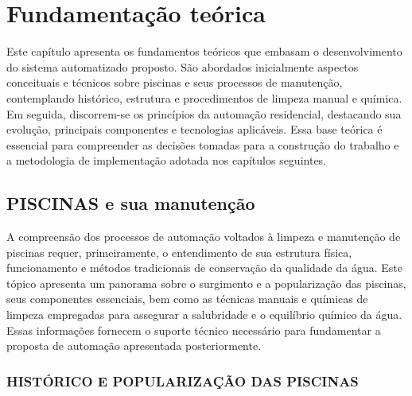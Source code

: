 \chapter{Fundamentação teórica}

    Este capítulo apresenta os fundamentos teóricos que embasam o desenvolvimento do sistema automatizado proposto. São abordados inicialmente aspectos conceituais e técnicos sobre piscinas e seus processos de manutenção, contemplando histórico, estrutura e procedimentos de limpeza manual e química. Em seguida, discorrem-se os princípios da automação residencial, destacando sua evolução, principais componentes e tecnologias aplicáveis. Essa base teórica é essencial para compreender as decisões tomadas para a construção do trabalho e a metodologia de implementação adotada nos capítulos seguintes.

\section{PISCINAS e sua manutenção}

    A compreensão dos processos de automação voltados à limpeza e manutenção de piscinas requer, primeiramente, o entendimento de sua estrutura física, funcionamento e métodos tradicionais de conservação da qualidade da água. Este tópico apresenta um panorama sobre o surgimento e a popularização das piscinas, seus componentes essenciais, bem como as técnicas manuais e químicas de limpeza empregadas para assegurar a salubridade e o equilíbrio químico da água. Essas informações fornecem o suporte técnico necessário para fundamentar a proposta de automação apresentada posteriormente.

    \subsection{HISTÓRICO E POPULARIZAÇÃO DAS PISCINAS}
    

